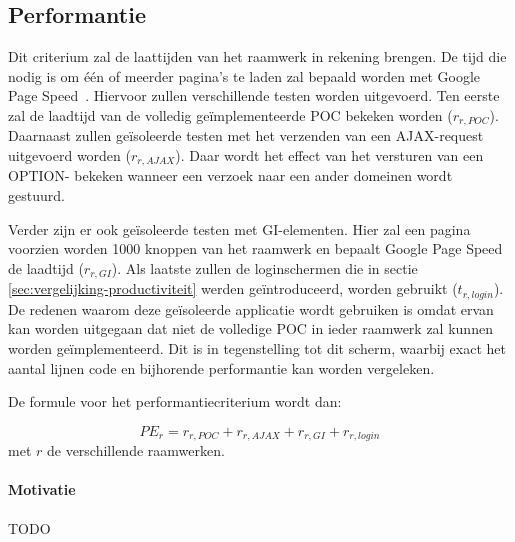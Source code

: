 \subsection{Performantie}
\label{sec:vergelijking-performantie}
Dit criterium zal de laattijden van het raamwerk in rekening brengen.
De tijd die nodig is om één of meerder pagina's te laden zal bepaald worden met Google Page Speed~\cite{Morgan2011}. 
Hiervoor zullen verschillende testen worden uitgevoerd. 
Ten eerste zal de laadtijd van de volledig geïmplementeerde POC bekeken worden ($r_{r,POC}$). 
Daarnaast zullen geïsoleerde testen met het verzenden van een AJAX-request uitgevoerd worden ($r_{r,AJAX}$).
Daar wordt het effect van het versturen van een OPTION- bekeken wanneer een verzoek naar een ander domeinen wordt gestuurd.

Verder zijn er ook geïsoleerde testen met GI-elementen. 
Hier zal een  pagina voorzien worden 1000 knoppen van het raamwerk en bepaalt Google Page Speed de laadtijd ($r_{r,GI}$). 
Als laatste zullen de loginschermen die in sectie \ref{sec:vergelijking-productiviteit} werden geïntroduceerd, worden gebruikt ($t_{r,login}$). 
De redenen waarom deze geïsoleerde applicatie wordt gebruiken is omdat ervan kan worden uitgegaan dat niet de volledige POC in ieder raamwerk zal kunnen worden geïmplementeerd. 
Dit is in tegenstelling tot dit scherm, waarbij exact het aantal lijnen code en bijhorende performantie kan worden vergeleken.

De formule voor het performantiecriterium wordt dan: 

\begin{equation}
  PE_r=r_{r,POC}+r_{r,AJAX}+r_{r,GI}+r_{r,login} 
  \label{eq:performantie}
\end{equation}
met $r$ de verschillende raamwerken.

\paragraph{Motivatie}
TODO

